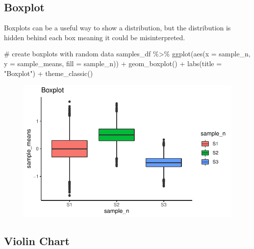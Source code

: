 \documentclass[
  letterpaper,
  DIV=11,
  numbers=noendperiod]{scrreprt}
\newenvironment{Shaded}{\begin{snugshade}}{\end{snugshade}}
\newcommand{\AttributeTok}[1]{\textcolor[rgb]{0.40,0.45,0.13}{#1}}
\newcommand{\CommentTok}[1]{\textcolor[rgb]{0.37,0.37,0.37}{#1}}
\newcommand{\FunctionTok}[1]{\textcolor[rgb]{0.28,0.35,0.67}{#1}}
\newcommand{\NormalTok}[1]{\textcolor[rgb]{0.00,0.23,0.31}{#1}}
\newcommand{\SpecialCharTok}[1]{\textcolor[rgb]{0.37,0.37,0.37}{#1}}
\newcommand{\StringTok}[1]{\textcolor[rgb]{0.13,0.47,0.30}{#1}}
\begin{document}
\hypertarget{boxplot}{%
\subsection{Boxplot}\label{boxplot}}

Boxplots can be a useful way to show a distribution, but the
distribution is hidden behind each box meaning it could be
misinterpreted.

\begin{Shaded}
\begin{Highlighting}[]
\CommentTok{\# create boxplots with random data}
\NormalTok{samples\_df }\SpecialCharTok{\%\textgreater{}\%}
  \FunctionTok{ggplot}\NormalTok{(}\FunctionTok{aes}\NormalTok{(}\AttributeTok{x =}\NormalTok{ sample\_n, }\AttributeTok{y =}\NormalTok{ sample\_means, }\AttributeTok{fill =}\NormalTok{ sample\_n)) }\SpecialCharTok{+}
  \FunctionTok{geom\_boxplot}\NormalTok{() }\SpecialCharTok{+}
  \FunctionTok{labs}\NormalTok{(}\AttributeTok{title =} \StringTok{"Boxplot"}\NormalTok{) }\SpecialCharTok{+}
  \FunctionTok{theme\_classic}\NormalTok{()}
\end{Highlighting}
\end{Shaded}

\begin{figure}[H]

{\centering \includegraphics{./visualizing-data_files/figure-pdf/unnamed-chunk-5-1.pdf}

}

\end{figure}

\hypertarget{violin-chart}{%
\subsection{Violin Chart}\label{violin-chart}}
\end{document}
